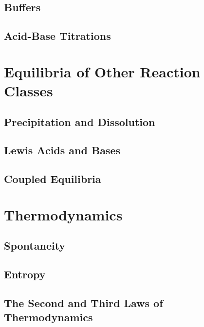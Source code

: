 \documentclass[12pt, openany, letterpaper]{memoir}
\begin{document}
\section{Buffers}

\section{Acid-Base Titrations}

\chapter{Equilibria of Other Reaction Classes}

\section{Precipitation and Dissolution}

\section{Lewis Acids and Bases}

\section{Coupled Equilibria}

\chapter{Thermodynamics}

\section{Spontaneity}

\section{Entropy}

\section{The Second and Third Laws of Thermodynamics}
\end{document}
